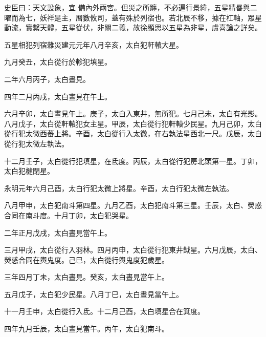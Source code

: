 
\begin{pinyinscope}

 史臣曰：天文設象，宜
 備內外兩宮。但災之所躔，不必遍行景緯，五星精晷與二曜而為七，妖祥是主，曆數攸司，蓋有殊於列宿也。若北辰不移，據在杠軸，眾星動流，實繫天體，五星從伏，非關二義，故徐顯思以五星為非星，虞喜論之詳矣。



 五星相犯列宿雜災建元元年八月辛亥，太白犯軒轅大星。



 九月癸丑，太白從行於軫犯填星。



 二年六月丙子，太白晝見。



 四年二月丙戌，太白晝見在午上。



 六月辛卯，太白晝見午上。庚子，太白入東井，無所犯。七月己未，太白有光影。八月戊子，太白從軒轅犯女主星。甲辰，太白從行犯軒轅少民星。九月己卯，太白從行犯太微西蕃上將。辛酉，太白從行入太微，在右執法星西北一尺。戊辰，太白從行犯太微左執法。



 十二月壬子，太白從行犯填星，在氐度。丙辰，太白從行犯房北頭第一星。丁卯，太白犯楗閉星。



 永明元年六月己酉，太白行犯太微上將星。辛酉，太白行犯太微左執法。



 八月甲申，太白犯南斗第四星。九月乙酉，太白犯南斗第三星。壬辰，太白、熒惑合同在南斗度。十月丁卯，太白犯哭星。



 二年正月戊戌，太白晝見當午上。



 三月甲戌，太白從行入羽林。四月丙申，太白從行犯東井鉞星。六月戊辰，太白、熒惑合同在輿鬼度。己巳，太白從行輿鬼度犯歲星。



 三年四月丁未，太白晝見。癸亥，太白晝見當午上。



 五月戊子，太白犯少民星。八月丁巳，太白晝見當午上。



 十一月壬申，太白從行入氐。十二月己酉，太白填星合在箕度。



 四年九月壬辰，太白晝見當午。丙午，太白犯南斗。




\end{pinyinscope}
